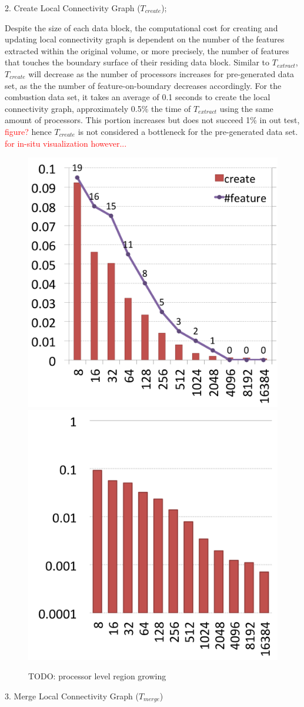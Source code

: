 \documentclass[10pt, conference, compsocconf]{IEEEtran}
\begin{document}
2. Create Local Connectivity Graph ($T_{create}$);

Despite the size of each data block, the computational cost for creating and updating local connectivity graph is dependent on the number of the features extracted within the original volume, or more precisely, the number of features that touches the boundary surface of their residing data block. Similar to $T_{extract}$, $T_{create}$ will decrease as the number of processors increases for pre-generated data set, as the the number of feature-on-boundary decreases accordingly. For the combustion data set, it takes an average of 0.1 seconds to create the local connectivity graph, approximately 0.5\% the time of $T_{extract}$ using the same amount of processors. This portion increases but does not succeed 1\% in out test, \textcolor{red}{figure?} hence $T_{create}$ is not considered a bottleneck for the pre-generated data set. \textcolor{red}{for in-situ visualization however... }

\begin{figure}[ht]
	\centering
	\includegraphics[width=0.45\linewidth]{create_local_graph.png}
	\includegraphics[width=0.45\linewidth]{create_local_graph_log.png}
	\caption{TODO: processor level region growing}
	\label{fig:create-local-graph}
\end{figure}

3. Merge Local Connectivity Graph ($T_{merge}$)
\end{document}
